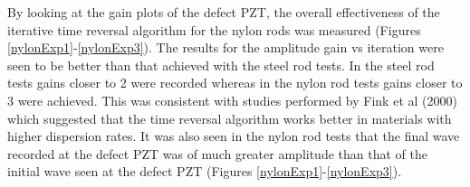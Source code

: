 \documentclass[11pt,letterpaper]{article}%
\begin{document}
By looking at the gain plots of the defect PZT, the overall effectiveness of the iterative time reversal algorithm for the nylon rods was measured (Figures \ref{nylonExp1}-\ref{nylonExp3}). The results for the amplitude gain vs iteration were seen to be better than that achieved with the steel rod tests. In the steel rod tests gains closer to 2 were recorded whereas in the nylon rod tests gains closer to 3 were achieved. This was consistent with studies performed by Fink et al (2000) which suggested that the time reversal algorithm works better in materials with higher dispersion rates. It was also seen in the nylon rod tests that the final wave recorded at the defect PZT was of much greater amplitude than that of the initial wave seen at the defect PZT (Figures \ref{nylonExp1}-\ref{nylonExp3}).

 \begin{figure}
\begin{subfigmatrix}{3}
\end{subfigmatrix}


\end{figure}
\end{document}
